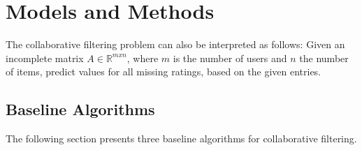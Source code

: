 \section{Models and Methods}
\label{sec:models-methods}

The collaborative filtering problem can also be interpreted as follows: Given an incomplete matrix $A \in \mathbb{R}^{m x n}$, where $m$ is the number of users and $n$ the number of items, predict values for all missing ratings, based on the given entries.




\subsection{Baseline Algorithms}\label{sec:baseline}

The following section presents three baseline algorithms for collaborative filtering. 











